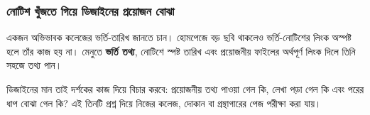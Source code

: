 \subsubsection{নোটিশ খুঁজতে গিয়ে ডিজাইনের প্রয়োজন বোঝা}
একজন অভিভাবক কলেজের ভর্তি-তারিখ জানতে চান। হোমপেজে বড় ছবি থাকলেও ভর্তি-নোটিশের লিংক অস্পষ্ট হলে তাঁর কাজ হয় না। মেনুতে \textbf{ভর্তি তথ্য}, নোটিশে স্পষ্ট তারিখ এবং প্রয়োজনীয় ফাইলের অর্থপূর্ণ লিংক দিলে তিনি সহজে তথ্য পান।

ডিজাইনের মান তাই দর্শকের কাজ দিয়ে বিচার করবে: প্রয়োজনীয় তথ্য পাওয়া গেল কি, লেখা পড়া গেল কি এবং পরের ধাপ বোঝা গেল কি? এই তিনটি প্রশ্ন দিয়ে নিজের কলেজ, দোকান বা গ্রন্থাগারের পেজ পরীক্ষা করা যায়।
